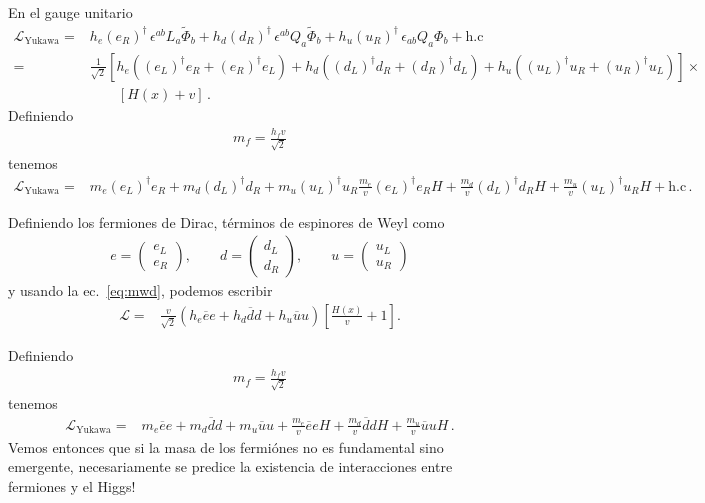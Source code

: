 \begin{frame}
En el gauge unitario
\begin{align}
  \mathcal{L}_{\text{Yukawa}}=& h_e \left( e_R \right)^{\dagger}\,\epsilon^{ab}L_a\widetilde{\Phi}_b +
      h_d \left( d_R \right)^{\dagger}\,\epsilon^{ab}Q_a\widetilde{\Phi}_b +
      h_u \left( u_R \right)^{\dagger}\,\epsilon_{ab}Q_a{\Phi}_{b}+\text{h.c}\nonumber\\
=&\frac{1}{\sqrt{2}}\left[h_e((e_L)^{\dagger}e_R+(e_R)^{\dagger}e_L)+
h_d((d_L)^{\dagger}d_R+(d_R)^{\dagger}d_L)
+h_u((u_L)^{\dagger}u_R+(u_R)^{\dagger}u_L)\right]\times\nonumber\\
&\qquad\left[H(x)+v\right]\,.
\end{align}
Definiendo
\begin{align}
  m_f=\frac{h_fv}{\sqrt{2}}
\end{align}
tenemos
\begin{align}
\label{eq:lyuklr}
  \mathcal{L}_{\text{Yukawa}}=&m_e (e_L)^{\dagger}e_R+m_d (d_L)^{\dagger}d_R+m_u(u_L)^{\dagger}u_R
\frac{m_e}{v}  (e_L)^{\dagger}e_RH+\frac{m_d}{v}  (d_L)^{\dagger}d_RH+\frac{m_u}{v} (u_L)^{\dagger}u_RH
+\text{h.c}\,.
\end{align}

Definiendo los fermiones de Dirac, términos de espinores de Weyl como
\begin{align}
  e=
  \begin{pmatrix}
    e_L\\
    e_R
  \end{pmatrix},\qquad d=
  \begin{pmatrix}
    d_L\\
    d_R
  \end{pmatrix},\qquad u=
  \begin{pmatrix}
    u_L\\
    u_R
  \end{pmatrix}
\end{align}
y usando la ec.~\eqref{eq:mwd}, podemos escribir
\begin{align*}
\mathcal{L}=&\frac{v}{\sqrt{2}}\left(h_e\overline{e}e+h_d\overline{d}d
+h_u\overline{u}u\right)
\left[\frac{H(x)}{v}+1\right].
\end{align*}

Definiendo
\begin{align}
  m_f=\frac{h_fv}{\sqrt{2}}
\end{align}
tenemos
\begin{align}
\label{eq:lyukfin}
 \mathcal{L}_{\text{Yukawa}}=&m_e\overline{e}e+m_d\overline{d}d
+m_u\overline{u}u+
  \frac{m_e}{v}\overline{e}e H+\frac{m_d}{v}\overline{d}d H
+\frac{m_u}{v}\overline{u}u H\,.
\end{align}
Vemos entonces que si la masa de los fermiónes no es fundamental sino
emergente, necesariamente se predice la existencia de interacciones
entre fermiones y el Higgs!

\end{frame}

